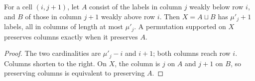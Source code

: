 \begin{lemma}
\label{lem:garnir-set}
\leanok
For a cell $(i,j+1)$, let $A$ consist of the labels in column $j$
weakly below row $i$, and $B$ of those in column $j+1$ weakly above
row $i$. Then $X=A\sqcup B$ has $\mu'_j+1$ labels, all in columns
of length at most $\mu'_j$. A permutation supported on $X$
preserves columns exactly when it preserves $A$.
\end{lemma}
\begin{proof}
The two cardinalities are $\mu'_j-i$ and $i+1$; both columns
reach row $i$. Columns shorten to the right. On $X$, the column
is $j$ on $A$ and $j+1$ on $B$, so preserving columns is equivalent
to preserving $A$.
\end{proof}

